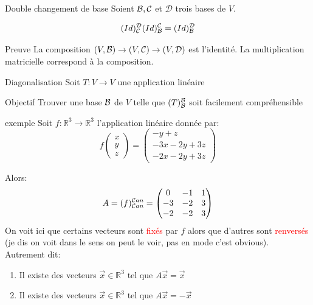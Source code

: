 \begin{parag}{Double changement de base}
    Soient $\mathcal{B}, \mathcal{C}$ et $\mathcal{D}$ trois bases de $V$.
    \begin{formule}
        \[(Id)_{\mathcal{C}}^{\mathcal{D}}(Id)_{\mathcal{B}}^{\mathcal{C}} = (Id)_{\mathcal{B}}^{\mathcal{D}}\]
    \end{formule}
    \begin{subparag}{Preuve}
        La composition $(V, \mathcal{B}) \to (V, \mathcal{C}) \to (V, \mathcal{D})$ est l'identité. La multiplication matricielle correspond à la composition.
    \end{subparag}
\end{parag}

\begin{parag}{Diagonalisation}
    Soit $T: V \to V$ une application linéaire
    \begin{subparag}{Objectif}
        Trouver une base $\mathcal{B}$ de $V$ telle que $(T)_{\mathcal{B}}^{\mathcal{B}}$ soit facilement compréhensible
    \end{subparag}
    \begin{subparag}{exemple}
        Soit $f : \mathbb{R}^3 \to \mathbb{R}^3$ l'application linéaire donnée par:
        \[f\begin{pmatrix}
            x \\ y \\ z
        \end{pmatrix} = \begin{pmatrix}
            -y + z \\ -3x -2y + 3z\\
            -2x -2y + 3z
        \end{pmatrix}\]

        Alors:
        \[A = (f)_{\mathcal{C} an} ^{\mathcal{C} an} = \begin{pmatrix}
            0 & -1 & 1\\
            -3 & -2 & 3\\
            -2 & -2 & 3
        \end{pmatrix} \]
        On voit ici que certains vecteurs sont \textcolor{red}{fixés} par $f$ alors que d'autres sont \textcolor{red}{renversés} (je dis on voit dans le sens on peut le voir, pas en mode c'est obvious).\\
        Autrement dit:
        \begin{enumerate}
            \item Il existe des vecteurs $\vec{x} \in \mathbb{R}^3$ tel que $A\vec{x} = \vec{x}$
            \item Il existe des vecteurs $\vec{x} \in \mathbb{R}^3$ tel que $A\vec{x} = -\vec{x}$
        \end{enumerate}
        


\end{subparag}
\end{parag}
